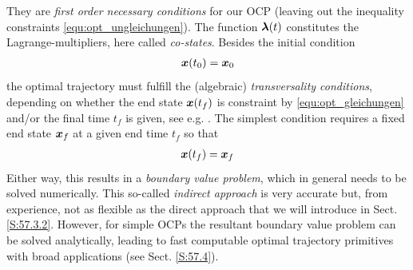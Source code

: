 They are \textit{first order necessary conditions} for our OCP (leaving out the inequality
constraints \eqref{equ:opt_ungleichungen}). The function $\boldsymbol{\lambda}(t)$
constitutes the Lagrange-multipliers, here called \textit{co-states}. Besides the initial condition
\begin{align}
\bs x(t_0) = \bs x_0 \label{equ:fester_anfangszustand}
\end{align}
the optimal trajectory must fulfill the (algebraic)\textit{ transversality conditions}, depending on whether the end state $\boldsymbol{x}(t_f)$
is constraint by \eqref{equ:opt_gleichungen} and/or the final time $t_f$ is given, see e.g. \cite{Lewis_OC}. 
The simplest condition requires a fixed end state $\boldsymbol{x}_f$ at a given end time  $t_f$
so that
\begin{align}
\bs x(t_f) = \bs x_f \label{equ:fester_endpunkt}
\end{align}
Either way, this results in a \textit{boundary value problem}, which in general needs to be solved numerically. This so-called \textit{indirect approach} is very accurate but, from experience, not as flexible as the direct approach that we will introduce in Sect. \ref{S:57.3.2}. However, for simple OCPs the resultant boundary value problem can be solved analytically, leading to fast computable optimal trajectory primitives with broad applications (see Sect. \ref{S:57.4}).

